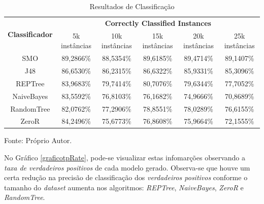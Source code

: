 \documentclass[
	12pt,				%
	openright,			%
	oneside,	
	a4paper,				%
	english,				%
	brazil				%
]{abntex2/abntex2} %
\begin{document}
	\begin{table}[!htb]
		\centering
		\caption{\fontsize{10}{\baselineskip} \selectfont Resultados de Classificação}
		\label{tabResultadosClassificacao}
		\begin{flushleft}
		\renewcommand{\arraystretch}{2}	
		\begin{tabular}{cccccc}
			\hline
			\multicolumn{1}{c|}{\multirow{2}{*}{\textbf{Classificador}}} & \multicolumn{5}{c}{\textbf{Correctly Classified Instances}}                       \\ \cline{2-6} 
			\multicolumn{1}{c|}{}                                        & 5k instâncias & 10k instâncias & 15k instâncias & 20k instâncias & 25k instâncias \\ \hline
			SMO                                                          & 89,2866\%     & 88,5354\%      & 89,6185\%      & 89,4714\%      & 89,1407\%      \\
			J48                                                          & 86,6530\%      & 86,2315\%      & 86,6322\%      & 85,9331\%      & 85,3096\%      \\
			REPTree                                                      & 83,9683\%     & 79,7414\%      & 80,7076\%      & 79,6344\%      & 77,7052\%      \\
			NaiveBayes                                                   & 83,5592\%     & 76,8103\%      & 76,1682\%      & 74,9666\%      & 70,8689\%      \\
			RandomTree                                                   & 82,0762\%     & 77,2906\%      & 78,8551\%      & 78,0289\%      & 76,6155\%      \\
			ZeroR                                                        & 84,2496\%     & 75,6773\%      & 76,8608\%      & 75,9664\%      & 72,1555\%      \\ \hline
		\end{tabular}
	\end{flushleft}
	\begin{flushleft}
	{\fontsize{10}{\baselineskip} \selectfont Fonte: Próprio Autor.}
	\end{flushleft}
	\end{table}
	

No Gráfico \ref{graficotpRate}, pode-se visualizar estas infomarções observando a \textit{taxa de verdadeiros positivos} de cada modelo gerado. Observa-se que houve um certa redução na precisão de classificação dos \textit{verdadeiros positivos}  conforme o tamanho do \textit{dataset} aumenta  nos algoritmos: \textit{REPTree}, \textit{NaiveBayes}, \textit{ZeroR} e \textit{RandomTree}.
\end{document}
